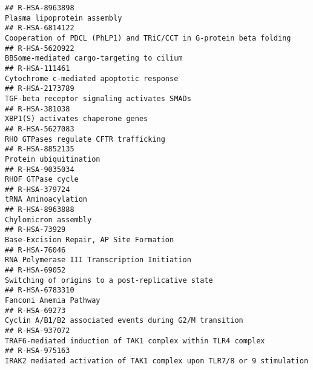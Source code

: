 \documentclass[
]{article}
\begin{document}
\begin{verbatim}
## R-HSA-8963898                                                                                                          Plasma lipoprotein assembly
## R-HSA-6814122                                                                   Cooperation of PDCL (PhLP1) and TRiC/CCT in G-protein beta folding
## R-HSA-5620922                                                                                            BBSome-mediated cargo-targeting to cilium
## R-HSA-111461                                                                                              Cytochrome c-mediated apoptotic response
## R-HSA-2173789                                                                                          TGF-beta receptor signaling activates SMADs
## R-HSA-381038                                                                                                     XBP1(S) activates chaperone genes
## R-HSA-5627083                                                                                                RHO GTPases regulate CFTR trafficking
## R-HSA-8852135                                                                                                               Protein ubiquitination
## R-HSA-9035034                                                                                                                    RHOF GTPase cycle
## R-HSA-379724                                                                                                                   tRNA Aminoacylation
## R-HSA-8963888                                                                                                                 Chylomicron assembly
## R-HSA-73929                                                                                                Base-Excision Repair, AP Site Formation
## R-HSA-76046                                                                                            RNA Polymerase III Transcription Initiation
## R-HSA-69052                                                                                       Switching of origins to a post-replicative state
## R-HSA-6783310                                                                                                               Fanconi Anemia Pathway
## R-HSA-69273                                                                                Cyclin A/B1/B2 associated events during G2/M transition
## R-HSA-937072                                                                          TRAF6-mediated induction of TAK1 complex within TLR4 complex
## R-HSA-975163                                                                IRAK2 mediated activation of TAK1 complex upon TLR7/8 or 9 stimulation

\end{verbatim}
\end{document}
